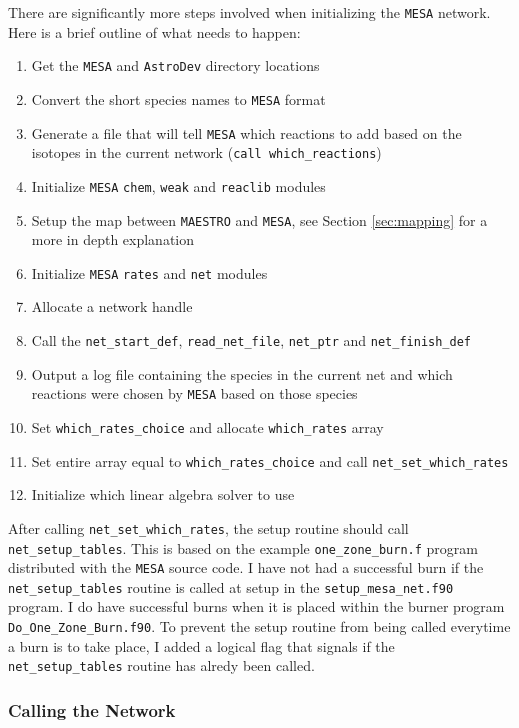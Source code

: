 There are significantly more steps involved when initializing the {\tt MESA} 
network. Here is a brief outline of what needs to happen:
\begin{enumerate}
\item Get the {\tt MESA} and {\tt AstroDev} directory locations
\item Convert the short species names to {\tt MESA} format
\item Generate a file that will tell {\tt MESA} which reactions to add based 
on the isotopes in the current network ({\tt call which\_reactions})
\item Initialize {\tt MESA} {\tt chem}, {\tt weak} and {\tt reaclib} modules
\item Setup the map between {\tt MAESTRO} and {\tt MESA}, see Section 
\ref{sec:mapping} for a more in depth explanation
\item Initialize {\tt MESA} {\tt rates} and {\tt net} modules
\item Allocate a network handle
\item Call the {\tt net\_start\_def}, {\tt read\_net\_file}, {\tt net\_ptr} 
and {\tt net\_finish\_def}
\item Output a log file containing the species in the current net and which 
reactions were chosen by {\tt MESA} based on those species
\item Set {\tt which\_rates\_choice} and allocate {\tt which\_rates} array
\item Set entire array equal to {\tt which\_rates\_choice} and call 
{\tt net\_set\_which\_rates}
\item Initialize which linear algebra solver to use
\end{enumerate}

After calling {\tt net\_set\_which\_rates}, the setup routine should call 
{\tt net\_setup\_tables}. This is based on the example 
{\tt one\_zone\_burn.f} program distributed with the {\tt MESA} source code. 
I have not had a successful burn if the {\tt net\_setup\_tables} routine is 
called at setup in the {\tt setup\_mesa\_net.f90} program. I do have 
successful burns when it is placed within the burner program 
{\tt Do\_One\_Zone\_Burn.f90}. To prevent the setup routine from being called 
everytime a burn is to take place, I added a logical flag that signals if the 
{\tt net\_setup\_tables} routine has alredy been called.

\subsubsection{Calling the Network}

